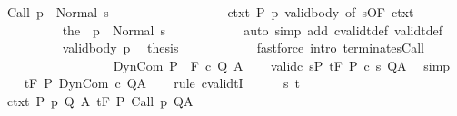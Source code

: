 \begin{isabellebody}
\ {\isachardoublequoteopen}{\isasymGamma}{\isasymturnstile}Call\ p\ {\isasymdown}\ Normal\ s{\isachardoublequoteclose}\isanewline
\ \ \ \ \ \ \isamarkupfalse%
\ {\isacharminus}\isanewline
\ \ \ \ \ \ \ \ \isamarkupfalse%
\ ctxt\ P\ p\ valid{\isacharunderscore}body{\isacharprime}\ {\isacharbrackleft}of\ {\isachardoublequoteopen}s{\isachardoublequoteclose}{\isacharcomma}OF\ ctxt{\isacharbrackright}\isanewline
\ \ \ \ \ \ \ \ \isamarkupfalse%
\ {\isachardoublequoteopen}{\isasymGamma}{\isasymturnstile}{\isacharparenleft}the\ {\isacharparenleft}{\isasymGamma}\ p{\isacharparenright}{\isacharparenright}\ {\isasymdown}\ Normal\ s{\isachardoublequoteclose}\isanewline
\ \ \ \ \ \ \ \ \ \ \isamarkupfalse%
\ {\isacharparenleft}auto\ simp\ add{\isacharcolon}\ cvalidt{\isacharunderscore}def\ validt{\isacharunderscore}def{\isacharparenright}\isanewline
\ \ \ \ \ \ \ \ \isamarkupfalse%
\ valid{\isacharunderscore}body\ p\ \isamarkupfalse%
\ {\isacharquery}thesis\isanewline
\ \ \ \ \ \ \ \ \ \ \isamarkupfalse%
\ {\isacharparenleft}fastforce\ intro{\isacharcolon}\ terminates{\isachardot}Call{\isacharparenright}\isanewline
\ \ \ \ \ \ \isamarkupfalse%
\isanewline
\ \ \ \ \isamarkupfalse%
\isanewline
\ \ \isamarkupfalse%
\isanewline
{}\isamarkupfalse%
\isanewline
\ \ \isamarkupfalse%
\ {\isacharparenleft}DynCom\ P\ {\isasymTheta}\ F\ c\ Q\ A{\isacharparenright}\isanewline
\ \ \isamarkupfalse%
\ valid{\isacharunderscore}c{\isacharcolon}\ {\isachardoublequoteopen}{\isasymforall}s{\isasymin}P{\isachardot}\ {\isasymGamma}{\isacharcomma}{\isasymTheta}{\isasymTurnstile}\isactrlsub t\isactrlbsub {\isacharslash}F\isactrlesub \ P\ {\isacharparenleft}c\ s{\isacharparenright}\ Q{\isacharcomma}A{\isachardoublequoteclose}\ \isamarkupfalse%
\ simp\isanewline
\ \ \isamarkupfalse%
\ {\isachardoublequoteopen}{\isasymGamma}{\isacharcomma}{\isasymTheta}{\isasymTurnstile}\isactrlsub t\isactrlbsub {\isacharslash}F\isactrlesub \ P\ DynCom\ c\ Q{\isacharcomma}A{\isachardoublequoteclose}\isanewline
\ \ \isamarkupfalse%
\ {\isacharparenleft}rule\ cvalidtI{\isacharparenright}\isanewline
\ \ \ \ \isamarkupfalse%
\ s\ t\isanewline
\ \ \ \ \isamarkupfalse%
\ ctxt{\isacharcolon}\ {\isachardoublequoteopen}{\isasymforall}{\isacharparenleft}P{\isacharcomma}\ p{\isacharcomma}\ Q{\isacharcomma}\ A{\isacharparenright}{\isasymin}{\isasymTheta}{\isachardot}\ {\isasymGamma}{\isasymTurnstile}\isactrlsub t\isactrlbsub {\isacharslash}F\isactrlesub \ P\ {\isacharparenleft}Call\ p{\isacharparenright}\ Q{\isacharcomma}A{\isachardoublequoteclose}\isanewline

\end{isabellebody}
